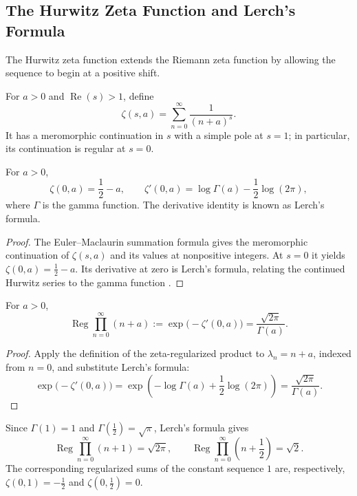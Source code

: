 \subsection{The Hurwitz Zeta Function and Lerch's Formula}

The Hurwitz zeta function extends the Riemann zeta function by allowing the sequence to begin at a positive shift.

\begin{definition}
For $a>0$ and $\operatorname{Re}(s)>1$, define
\[
 \zeta(s,a)=\sum_{n=0}^{\infty}\frac{1}{(n+a)^s}.
\]
It has a meromorphic continuation in $s$ with a simple pole at $s=1$; in particular, its continuation is regular at $s=0$.
\end{definition}

\begin{theorem}
For $a>0$,
\[
 \zeta(0,a)=\frac12-a,
 \qquad
 \zeta'(0,a)=\log\Gamma(a)-\frac12\log(2\pi),
\]
where $\Gamma$ is the gamma function. The derivative identity is known as Lerch's formula.
\end{theorem}

\begin{proof}
The Euler--Maclaurin summation formula gives the meromorphic continuation of $\zeta(s,a)$ and its values at nonpositive integers. At $s=0$ it yields $\zeta(0,a)=\tfrac12-a$. Its derivative at zero is Lerch's formula, relating the continued Hurwitz series to the gamma function \cite{Apostol1976-xj,SotoVillada2026ZR}.
\end{proof}

\begin{corollary}
For $a>0$,
\[
 \operatorname{Reg}\prod_{n=0}^{\infty}(n+a)
 :=\exp\!\bigl(-\zeta'(0,a)\bigr)
 =\frac{\sqrt{2\pi}}{\Gamma(a)}.
\]
\end{corollary}

\begin{proof}
Apply the definition of the zeta-regularized product to $\lambda_n=n+a$, indexed from $n=0$, and substitute Lerch's formula:
\[
 \exp\!\bigl(-\zeta'(0,a)\bigr)
 =\exp\!\left(-\log\Gamma(a)+\frac12\log(2\pi)\right)
 =\frac{\sqrt{2\pi}}{\Gamma(a)}.
\]
\end{proof}

\begin{example}
Since $\Gamma(1)=1$ and $\Gamma(\tfrac12)=\sqrt{\pi}$, Lerch's formula gives
\[
 \operatorname{Reg}\prod_{n=0}^{\infty}(n+1)=\sqrt{2\pi},
 \qquad
 \operatorname{Reg}\prod_{n=0}^{\infty}\left(n+\frac12\right)=\sqrt{2}.
\]
The corresponding regularized sums of the constant sequence $1$ are, respectively, $\zeta(0,1)=-\tfrac12$ and $\zeta(0,\tfrac12)=0$.
\end{example}

